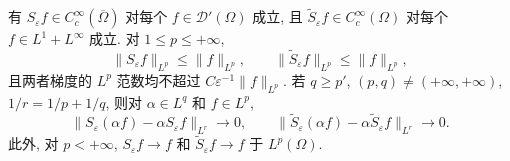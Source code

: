 \begin{Proposition}
\label{prop:chap3-mollifier-properties}
有 $S_\varepsilon f\in C_c^\infty(\overline\Omega)$ 对每个 $f\in\mathcal D'(\Omega)$ 成立, 且 $\widetilde S_\varepsilon f\in C_c^\infty(\Omega)$ 对每个 $f\in L^1+L^\infty$ 成立. 对 $1\leq p\leq+\infty$,
\begin{equation}
 \|S_\varepsilon f\|_{L^p}\leq\|f\|_{L^p},\qquad
 \|\widetilde S_\varepsilon f\|_{L^p}\leq\|f\|_{L^p},
 \label{eq:chap3-mollifier-lp-contractions}
\end{equation}
且两者梯度的 $L^p$ 范数均不超过 $C\varepsilon^{-1}\|f\|_{L^p}$. 若 $q\geq p'$, $(p,q)\neq(+\infty,+\infty)$, $1/r=1/p+1/q$, 则对 $\alpha\in L^q$ 和 $f\in L^p$,
\[
 \|S_\varepsilon(\alpha f)-\alpha S_\varepsilon f\|_{L^r}\to0,
 \qquad
 \|\widetilde S_\varepsilon(\alpha f)-\alpha\widetilde S_\varepsilon f\|_{L^r}\to0.
\]
此外, 对 $p<+\infty$, $S_\varepsilon f\to f$ 和 $\widetilde S_\varepsilon f\to f$ 于 $L^p(\Omega)$.
\end{Proposition}

